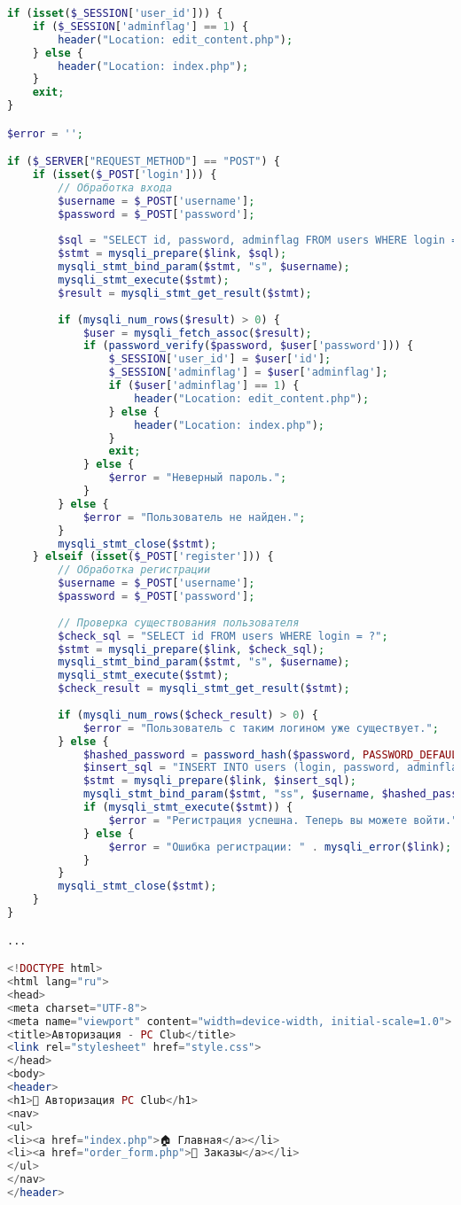 \begin{lstlisting}[language=PHP,frame=none]
if (isset($_SESSION['user_id'])) {
	if ($_SESSION['adminflag'] == 1) {
		header("Location: edit_content.php");
	} else {
		header("Location: index.php");
	}
	exit;
}

$error = '';

if ($_SERVER["REQUEST_METHOD"] == "POST") {
	if (isset($_POST['login'])) {
		// Обработка входа
		$username = $_POST['username'];
		$password = $_POST['password'];
		
		$sql = "SELECT id, password, adminflag FROM users WHERE login = ?";
		$stmt = mysqli_prepare($link, $sql);
		mysqli_stmt_bind_param($stmt, "s", $username);
		mysqli_stmt_execute($stmt);
		$result = mysqli_stmt_get_result($stmt);
		
		if (mysqli_num_rows($result) > 0) {
			$user = mysqli_fetch_assoc($result);
			if (password_verify($password, $user['password'])) {
				$_SESSION['user_id'] = $user['id'];
				$_SESSION['adminflag'] = $user['adminflag'];
				if ($user['adminflag'] == 1) {
					header("Location: edit_content.php");
				} else {
					header("Location: index.php");
				}
				exit;
			} else {
				$error = "Неверный пароль.";
			}
		} else {
			$error = "Пользователь не найден.";
		}
		mysqli_stmt_close($stmt);
	} elseif (isset($_POST['register'])) {
		// Обработка регистрации
		$username = $_POST['username'];
		$password = $_POST['password'];
		
		// Проверка существования пользователя
		$check_sql = "SELECT id FROM users WHERE login = ?";
		$stmt = mysqli_prepare($link, $check_sql);
		mysqli_stmt_bind_param($stmt, "s", $username);
		mysqli_stmt_execute($stmt);
		$check_result = mysqli_stmt_get_result($stmt);
		
		if (mysqli_num_rows($check_result) > 0) {
			$error = "Пользователь с таким логином уже существует.";
		} else {
			$hashed_password = password_hash($password, PASSWORD_DEFAULT);
			$insert_sql = "INSERT INTO users (login, password, adminflag) VALUES (?, ?, 0)";
			$stmt = mysqli_prepare($link, $insert_sql);
			mysqli_stmt_bind_param($stmt, "ss", $username, $hashed_password);
			if (mysqli_stmt_execute($stmt)) {
				$error = "Регистрация успешна. Теперь вы можете войти.";
			} else {
				$error = "Ошибка регистрации: " . mysqli_error($link);
			}
		}
		mysqli_stmt_close($stmt);
	}
}

...

<!DOCTYPE html>
<html lang="ru">
<head>
<meta charset="UTF-8">
<meta name="viewport" content="width=device-width, initial-scale=1.0">
<title>Авторизация - PC Club</title>
<link rel="stylesheet" href="style.css"> 
</head>
<body>
<header>
<h1>🔐 Авторизация PC Club</h1>
<nav>
<ul>
<li><a href="index.php">🏠 Главная</a></li>
<li><a href="order_form.php">🛒 Заказы</a></li>
</ul>
</nav>
</header>


\end{lstlisting}
